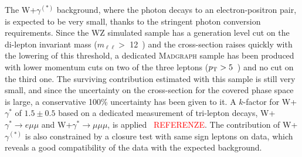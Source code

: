 The W+$\gamma^{(*)}$ background, where the photon decays to an electron-positron pair,
is expected to be very small, thanks to the stringent photon conversion
requirements.
 Since the WZ simulated sample has a generation level cut on the
di-lepton invariant mass ($m_{\ell\ell} >$ 12~\GeV) and the cross-section raises
quickly with the lowering of this threshold, a dedicated \textsc{Madgraph} sample has
been produced with lower momentum cuts on two of the three leptons
($p_\mathrm{T} > 5$~\GeV) and no cut on the third one. The surviving contribution
estimated with this sample is still very small, and since the uncertainty on the
cross-section for the covered phase space is large, a conservative 100\%
uncertainty has been given to it. 
A $k$-factor for W+$\gamma^{*}$ of $1.5\pm0.5$ based on a dedicated measurement of 
tri-lepton decays, W+$\gamma^{*} \to e\mu\mu$ and W+$\gamma^{*} \to \mu\mu\mu$,
is applied~\cite{WGammaStarStudy} \textcolor{red}{REFERENZE}. 
The contribution of W+$\gamma^{(*)}$ is also
constrained by a closure test with same sign leptons on data, which reveals a
good compatibility of the data with the expected background.

